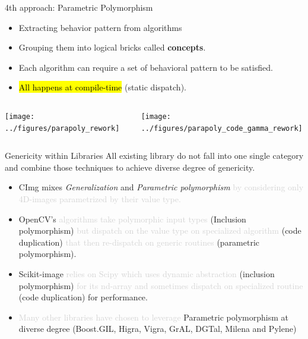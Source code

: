 \documentclass[12pt,aspectratio=169]{beamer}
\makeatletter
\newcommand{\GRAYOUT}[1]{\textcolor{lightgray}{#1}}%
\let\HL\hl
\renewcommand\hl{%
  \let\set@color\beamerorig@set@color
  \let\reset@color\beamerorig@reset@color
  \HL}
\makeatother
\begin{document}
\begin{frame}[fragile]{4th approach: Parametric Polymorphism}
  \begin{itemize}
    \item Extracting behavior pattern from algorithms
    \item Grouping them into logical bricks called \textbf{concepts}.
    \item Each algorithm can require a set of behavioral pattern to be satisfied.
    \item \hl{All happens at compile-time} (static dispatch).
  \end{itemize}

  \begin{columns}[T,onlytextwidth]
    \centering
    \texttt{[image: ../figures/parapoly\_rework]}

    \centering
    \texttt{[image: ../figures/parapoly\_code\_gamma\_rework]}
  \end{columns}
\end{frame}

\begin{frame}[fragile]{Genericity within Libraries}
  All existing library do not fall into one single category and combine those techniques to achieve diverse degree of
  genericity.
  \vspace{-0.2cm}\small\begin{itemize}
    \item CImg mixes \emph{Generalization} and \emph{Parametric polymorphism} \GRAYOUT{by considering only 4D-images
            parametrized by their value type.}
    \item OpenCV's \GRAYOUT{algorithms take polymorphic input types} (Inclusion polymorphism) \GRAYOUT{but dispatch on
            the value type on specialized algorithm} (code duplication) \GRAYOUT{that then re-dispatch on generic
            routines} (parametric polymorphism).
    \item Scikit-image \GRAYOUT{relies on Scipy which uses dynamic abstraction} (inclusion polymorphism) \GRAYOUT{for
            its nd-array and sometimes dispatch on specialized routine} (code duplication) for performance.
    \item \GRAYOUT{Many other libraries have chosen to leverage} Parametric polymorphism at diverse degree (Boost.GIL,
          Higra, Vigra, GrAL, DGTal, Milena and Pylene)
  \end{itemize}
\end{frame}
\end{document}
